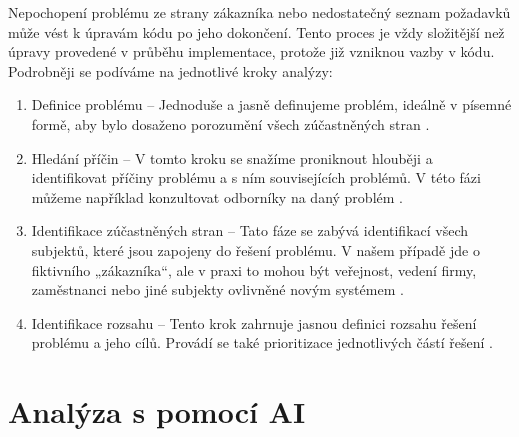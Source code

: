 \documentclass[FM,DP]{tulthesis}
\begin{document}
		Nepochopení problému ze strany zákazníka nebo nedostatečný seznam požadavků může vést k úpravám kódu po jeho dokončení. Tento proces je vždy složitější než úpravy provedené v průběhu implementace, protože již vzniknou vazby v kódu. Podrobněji se podíváme na jednotlivé kroky analýzy:
		
		\begin{enumerate}
			\item Definice problému – Jednoduše a jasně definujeme problém, ideálně v písemné formě, aby bylo dosaženo porozumění všech zúčastněných stran \cite{problem_analysis3}.
			\item Hledání příčin – V tomto kroku se snažíme proniknout hlouběji a identifikovat příčiny problému a s ním souvisejících problémů. V této fázi můžeme například konzultovat odborníky na daný problém \cite{problem_analysis3}.
			\item Identifikace zúčastněných stran – Tato fáze se zabývá identifikací všech subjektů, které jsou zapojeny do řešení problému. V našem případě jde o fiktivního „zákazníka“, ale v praxi to mohou být veřejnost, vedení firmy, zaměstnanci nebo jiné subjekty ovlivněné novým systémem \cite{problem_analysis3}.
			\item Identifikace rozsahu – Tento krok zahrnuje jasnou definici rozsahu řešení problému a jeho cílů. Provádí se také prioritizace jednotlivých částí řešení \cite{problem_analysis3}. 
		\end{enumerate}
		
		\section{Analýza s pomocí AI} 
\end{document}
